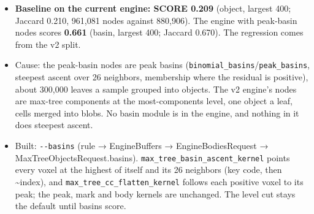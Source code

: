 \begin{enumerate}
\begin{itemize}
\item \textbf{Baseline on the current engine: SCORE 0.209} (object, largest 400; Jaccard 0.210, 961,081 nodes against 880,906). The engine with peak-basin nodes scores \textbf{0.661} (basin, largest 400; Jaccard 0.670). The regression comes from the v2 split.
\item Cause: the peak-basin nodes are peak basins (\texttt{binomial\_\allowbreak{}basins}/\texttt{peak\_\allowbreak{}basins}, steepest ascent over 26 neighbors, membership where the residual is positive), about 300,000 leaves a sample grouped into objects. The v2 engine's nodes are max-tree components at the most-components level, one object a leaf, cells merged into blobs. No basin module is in the engine, and nothing in it does steepest ascent.
\item Built: \texttt{-\allowbreak{}-\allowbreak{}basins} (rule → EngineBuffers → EngineBodiesRequest → MaxTreeObjectsRequest.basins). \texttt{max\_\allowbreak{}tree\_\allowbreak{}basin\_\allowbreak{}ascent\_\allowbreak{}kernel} points every voxel at the highest of itself and its 26 neighbors (key code, then \textasciitilde{}index), and \texttt{max\_\allowbreak{}tree\_\allowbreak{}cc\_\allowbreak{}flatten\_\allowbreak{}kernel} follows each positive voxel to its peak; the peak, mark and body kernels are unchanged. The level cut stays the default until basins score.
\end{itemize}
\end{enumerate}
